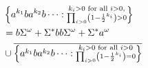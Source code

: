 \documentclass{beamer}
\begin{document}
\begin{frame}
\begin{columns}
\begin{column}{0.5\textwidth}
\begin{overlayarea}{\textwidth}{\textheight}
\begin{onlyenv}
\begin{uncoverenv}
              \begin{align*}
                &\left\{
                  a^{k_{1}}ba^{k_{2}}b\dots:
                  \substack{k_{i}>0\text{ for all }i>0,\\
                  \prod_{i>0}\left(1-\frac{1}{2}^{k_{i}}\right) > 0}
                \right\}\\
                &= b\Sigma^{\omega} + \Sigma^{*}bb\Sigma^{\omega} 
                + \Sigma^{*}a^{\omega}\\
                &\cup
                \overline{
                  \left\{
                    a^{k_{1}}ba^{k_{2}}b\dots:
                    \substack{k_{i}>0\text{ for all }i>0\\
                    \prod_{i>0}\left(1-\frac{1}{2}^{k_{i}}\right) = 0}
                  \right\}
                }
              \end{align*}
            \end{uncoverenv}
          \end{onlyenv}
        \end{overlayarea}
      \end{column}
    \end{columns}
  \end{frame}
\end{document}
